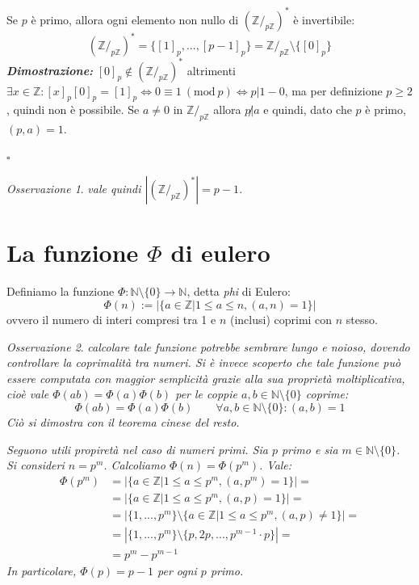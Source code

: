 \documentclass[oneside]{book}
\theoremstyle{remark}
\newtheorem*{osservaz}{Osservazione}
\newcommand{\Mod}[1]{\ (\mathrm{mod}\ #1)} %
\newcommand{\cvd}{\begin{flushright}$\square$\end{flushright}} %
\begin{document}
\begin{tcolorbox}[colback=green!30, colframe=green!30!black, title={Invertibilità e numeri primi}]
Se $p$ è primo, allora ogni elemento non nullo di $(\mathbb{Z}/_{p\mathbb{Z}})^*$ è invertibile:
\[ (\mathbb{Z}/_{p\mathbb{Z}})^* = \{[1]_p,...,[p-1]_p\} = \mathbb{Z}/_{p\mathbb{Z}} \setminus \{[0]_p\} \]
\textit{\textbf{Dimostrazione:}} $[0]_p \not \in (\mathbb{Z}/_{p\mathbb{Z}})^*$
altrimenti $\exists x \in \mathbb{Z}: [x]_p[0]_p = [1]_p \Longleftrightarrow 0 \equiv 1 \Mod{p}
\Longleftrightarrow p | 1-0$, ma per definizione $p\geq2$, quindi non è possibile. Se
$a\not=0$ in $\mathbb{Z}/_{p\mathbb{Z}}$ allora $p\not|a$ e quindi,
dato che $p$ è primo, $(p,a)=1$.
\cvd
\end{tcolorbox}
\begin{osservaz}
\emph{vale quindi $|(\mathbb{Z}/_{p\mathbb{Z}})^*| = p-1$.}
\end{osservaz}


\section{La funzione $\Phi$ di eulero}
\begin{tcolorbox}[colback=yellow!30, colframe=yellow!30!black, title=Funzione $\Phi$ di Eulero]
Definiamo la funzione $\Phi: \mathbb{N} \setminus \{0\} \to \mathbb{N}$, detta
\emph{phi} di Eulero: \[ \Phi(n) := \left|\{a\in\mathbb{Z}| 1\leq a \leq n, (a,n)=1 \}\right| \]
ovvero il numero di interi compresi tra 1 e $n$ (inclusi) coprimi con $n$ stesso.
\end{tcolorbox}
\begin{osservaz}
\emph{calcolare tale funzione potrebbe sembrare lungo e noioso, dovendo
controllare la coprimalità tra numeri. Si è invece scoperto che tale funzione
può essere computata con maggior semplicità grazie alla sua proprietà moltiplicativa,
cioè vale $\Phi(ab) = \Phi(a)\Phi(b)$ per le coppie $a,b \in \mathbb{N} \setminus \{0\}$
coprime:
\[ \Phi(ab) = \Phi(a)\Phi(b) \qquad \forall a,b \in \mathbb{N} \setminus \{0\}: (a,b)=1 \]
Ciò si dimostra con il teorema cinese del resto.}

\emph{Seguono utili propiretà nel caso di numeri primi. Sia $p$ primo e sia $m\in\mathbb{N}\setminus\{0\}$. Si consideri
$n=p^m$. Calcoliamo $\Phi(n) = \Phi(p^m)$. Vale:}
\begin{align*}
    \Phi(p^m) &= |\{a\in\mathbb{Z}|1\leq a \leq p^m, (a,p^m)=1\}| =\\
                &= |\{a\in\mathbb{Z}|1\leq a \leq p^m, (a,p)=1\}| =\\
                &= |\{1,...,p^m\} \setminus \{a\in\mathbb{Z}|1\leq a \leq p^m, (a,p)\not=1\}| =\\
                &= |\{1,...,p^m\} \setminus \{p, 2p,..., p^{m-1}\cdot p\}| =\\
                &= p^m - p^{m-1}
\end{align*}
\emph{In particolare, $\Phi(p) = p-1$ per ogni $p$ primo.}
\end{osservaz}
\end{document}

